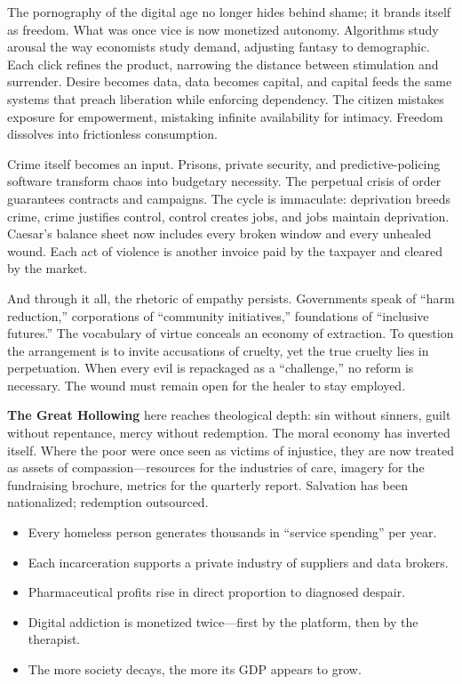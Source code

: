 \documentclass[11pt,twoside]{book}
\begin{document}
The pornography of the digital age no longer hides behind shame; it brands itself as freedom.  
What was once vice is now monetized autonomy.  
Algorithms study arousal the way economists study demand, adjusting fantasy to demographic.  
Each click refines the product, narrowing the distance between stimulation and surrender.  
Desire becomes data, data becomes capital, and capital feeds the same systems that preach liberation while enforcing dependency.  
The citizen mistakes exposure for empowerment, mistaking infinite availability for intimacy.  
Freedom dissolves into frictionless consumption.

Crime itself becomes an input.  
Prisons, private security, and predictive-policing software transform chaos into budgetary necessity.  
The perpetual crisis of order guarantees contracts and campaigns.  
The cycle is immaculate: deprivation breeds crime, crime justifies control, control creates jobs, and jobs maintain deprivation.  
Caesar’s balance sheet now includes every broken window and every unhealed wound.  
Each act of violence is another invoice paid by the taxpayer and cleared by the market.

And through it all, the rhetoric of empathy persists.  
Governments speak of “harm reduction,” corporations of “community initiatives,” foundations of “inclusive futures.”  
The vocabulary of virtue conceals an economy of extraction.  
To question the arrangement is to invite accusations of cruelty, yet the true cruelty lies in perpetuation.  
When every evil is repackaged as a “challenge,” no reform is necessary.  
The wound must remain open for the healer to stay employed.

\textbf{The Great Hollowing} here reaches theological depth: sin without sinners, guilt without repentance, mercy without redemption.  
The moral economy has inverted itself.  
Where the poor were once seen as victims of injustice, they are now treated as assets of compassion—resources for the industries of care, imagery for the fundraising brochure, metrics for the quarterly report.  
Salvation has been nationalized; redemption outsourced.

\begin{tcolorbox}[
  title=\textbf{Economy of Misery},
  colback=white,
  colframe=black,
  fonttitle=\bfseries,
  top=0.5mm,
  bottom=0.5mm,
  left=3pt,
  right=3pt,
  before skip=4pt,
  after skip=6pt,
  arc=1mm,
  boxrule=0.4pt
  ]
\setlength{\itemsep}{1pt}
\begin{itemize}
  \item Every homeless person generates thousands in “service spending” per year.  
  \item Each incarceration supports a private industry of suppliers and data brokers.  
  \item Pharmaceutical profits rise in direct proportion to diagnosed despair.  
  \item Digital addiction is monetized twice—first by the platform, then by the therapist.  
  \item The more society decays, the more its GDP appears to grow.  
\end{itemize}
\end{tcolorbox}
\end{document}
